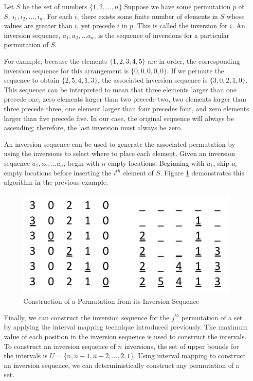 Let $S$ be the set of numbers $\{1, 2, ..., n\}$ Suppose we have some permutation $p$ of $S$, $i_1, i_2, ..., i_n$. For each $i$, there exists some finite number of elements in $S$ whose values are greater than $i$, yet precede $i$ in $p$. This is called the inversion for $i$. An inversion sequence, $a_1, a_2, ... a_n$, is the sequence of inversions for a particular permutation of $S$.

For example, because the elements $\{1, 2, 3, 4, 5\}$ are in order, the corresponding inversion sequence for this arrangement is $\{0, 0, 0, 0, 0\}$. If we permute the sequence to obtain $\{2, 5, 4, 1, 3\}$, the associated inversion sequence is $\{3, 0, 2, 1, 0\}$. This sequence can be interpreted to mean that three elements larger than one precede one, zero elements larger than two precede two, two elements larger than three precede three, one element larger than four precedes four, and zero elements larger than five precede five. In our case, the original sequence will always be ascending; therefore, the last inversion must always be zero.

An inversion sequence can be used to generate the associated permutation by using the inversions to select where to place each element. Given an inversion sequence $a_1, a_2, ... a_n$, begin with $n$ empty locations. Beginning with $a_1$, skip $a_i$ empty locations before inserting the $i^{th}$ element of $S$. Figure \ref{fig:inversion_sequence} demonstrates this algorithm in the previous example.

\begin{figure}[htb]
\centering
\centerline{\includegraphics[origin=c,width=12cm]{../figures/inversion-sequence.png}}
\caption{Construction of a Permutation from its Inversion Sequence}
\label{fig:inversion_sequence}
\end{figure}

Finally, we can construct the inversion sequence for the $j^{th}$ permutation of a set by applying the interval mapping technique introduced previously. The maximum value of each position in the inversion sequence is used to construct the intervals. To construct an inversion sequence of $n$ inversions, the set of upper bounds for the intervals is $U = \{n, n - 1, n - 2, ..., 2, 1\}$. Using interval mapping to construct an inversion sequence, we can deterministically construct any permutation of a set.

